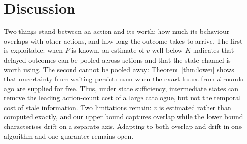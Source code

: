 \documentclass{article}
\theoremstyle{remark}
\begin{document}
\section{Discussion}\label{sec:conj}

Two things stand between an action and its worth: how much its behaviour overlaps with other
actions, and how long the outcome takes to arrive. The first is exploitable: when $P$ is known, an
estimate of $\bar v$ well below $K$ indicates that delayed outcomes can be pooled across actions
and that the state channel is worth using. The second cannot be pooled away:
Theorem~\ref{thm:lower} shows that uncertainty from waiting persists even when the exact losses
from $d$ rounds ago are supplied for free. Thus, under state sufficiency,
intermediate states can remove the leading action-count cost of a large catalogue, but not the
temporal cost of stale information. Two limitations remain:
$\bar v$ is estimated rather than computed exactly, and our upper bound captures overlap while the
lower bound characterises drift on a separate axis. Adapting to both overlap and drift in one
algorithm and one guarantee remains open.
\end{document}
